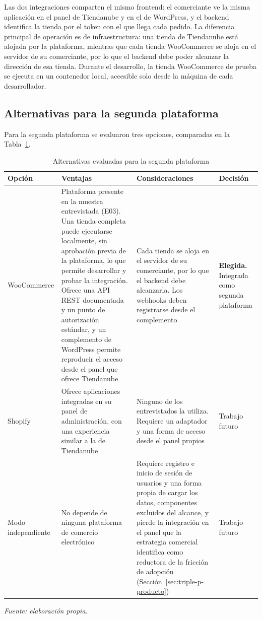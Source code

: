 Las dos integraciones comparten el mismo frontend: el comerciante ve la misma aplicación en el panel de Tiendanube y en el de WordPress, y el backend identifica la tienda por el token con el que llega cada pedido. La diferencia principal de operación es de infraestructura: una tienda de Tiendanube está alojada por la plataforma, mientras que cada tienda WooCommerce se aloja en el servidor de su comerciante, por lo que el backend debe poder alcanzar la dirección de esa tienda. Durante el desarrollo, la tienda WooCommerce de prueba se ejecuta en un contenedor local, accesible solo desde la máquina de cada desarrollador.

\subsection{Alternativas para la segunda plataforma}
\label{sec:multiplataforma-alternativas}

Para la segunda plataforma se evaluaron tres opciones, comparadas en la Tabla~\ref{tab:multiplataforma-alternativas}.

\begin{table}[!htbp]
\centering
\caption{Alternativas evaluadas para la segunda plataforma}
\label{tab:multiplataforma-alternativas}
\renewcommand{\arraystretch}{1.3}
\footnotesize
\setlength{\tabcolsep}{4pt}
\begin{tabular}{|>{\raggedright\arraybackslash}m{2.1cm}|>{\raggedright\arraybackslash}m{4.1cm}|>{\raggedright\arraybackslash}m{4.1cm}|>{\raggedright\arraybackslash}m{2.4cm}|}
\hline
\textbf{Opción} & \textbf{Ventajas} & \textbf{Consideraciones} & \textbf{Decisión} \\
\hline
WooCommerce & Plataforma presente en la muestra entrevistada (E03). Una tienda completa puede ejecutarse localmente, sin aprobación previa de la plataforma, lo que permite desarrollar y probar la integración. Ofrece una API REST documentada y un punto de autorización estándar, y un complemento de WordPress permite reproducir el acceso desde el panel que ofrece Tiendanube & Cada tienda se aloja en el servidor de su comerciante, por lo que el backend debe alcanzarla. Los webhooks deben registrarse desde el complemento & \textbf{Elegida.} Integrada como segunda plataforma \\
\hline
Shopify & Ofrece aplicaciones integradas en su panel de administración, con una experiencia similar a la de Tiendanube & Ninguno de los entrevistados la utiliza. Requiere un adaptador y una forma de acceso desde el panel propios & Trabajo futuro \\
\hline
Modo independiente & No depende de ninguna plataforma de comercio electrónico & Requiere registro e inicio de sesión de usuarios y una forma propia de cargar los datos, componentes excluidos del alcance, y pierde la integración en el panel que la estrategia comercial identifica como reductora de la fricción de adopción (Sección~\ref{sec:triple-p-producto}) & Trabajo futuro \\
\hline
\end{tabular}

\smallskip
\noindent\textit{Fuente: elaboración propia.}
\end{table}

